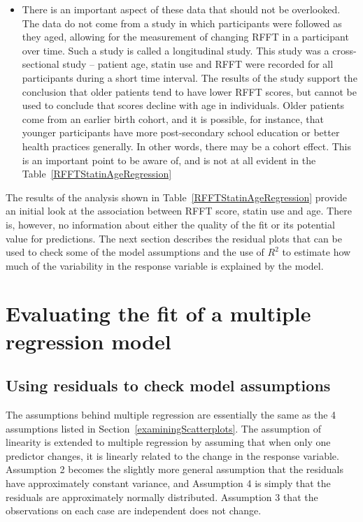 \begin{itemize}
  \item There is an important aspect of these data that should not be overlooked.  The data do not come from a study in which participants were followed as they aged, allowing for the measurement of changing RFFT in a participant over time. Such a study is called a longitudinal study.  This study was a cross-sectional study -- patient age, statin use and RFFT were recorded for all participants during a short time interval.  The results of the study support the conclusion that older patients tend to have lower RFFT scores, but cannot be used to conclude that scores decline with age in individuals.  Older patients come from an earlier birth cohort, and it is possible, for instance, that younger participants have more post-secondary school education or better health practices generally.  In other words, there may be a cohort effect.  This is an important point to be aware of, and is not at all evident in the Table~\ref{RFFTStatinAgeRegression}
  
 \end{itemize}
 
 
The results of the analysis shown in Table~\ref{RFFTStatinAgeRegression} provide an initial look at the association between RFFT score, statin use and age. There is, however, no information about either the quality of the fit or its potential value for predictions. The next section describes the residual plots that can be used to check some of the model assumptions and the use of $R^2$ to estimate how much of the variability in the response variable is explained by the model.

\section{Evaluating the fit of a multiple regression model}

\subsection{Using residuals to check model assumptions}

The assumptions behind multiple regression are essentially the same as the 4 assumptions listed in Section~\ref{examiningScatterplots}.  The assumption of linearity is extended to multiple regression by assuming that when only one predictor changes, it is linearly related to the change in the response variable.  Assumption 2 becomes the slightly more general assumption that the residuals have approximately constant variance, and Assumption 4 is simply that the residuals are approximately normally distributed. Assumption 3 that the observations on each case are independent does not change. 

